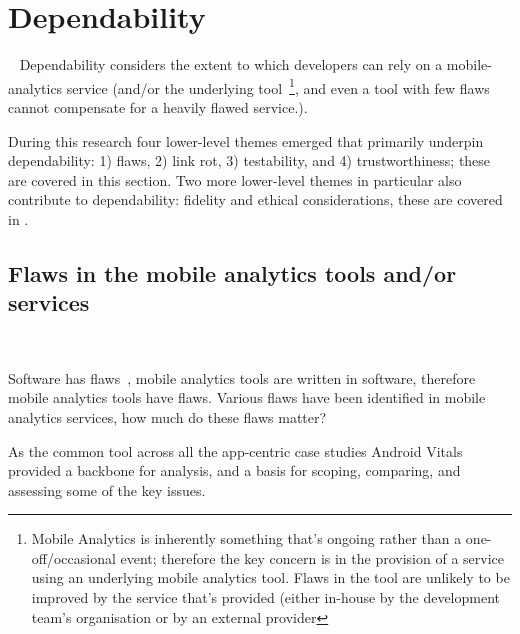 \section{Dependability}~\label{section-dependability}
Dependability considers the extent to which developers can rely on a mobile-analytics service (and/or the underlying tool~\footnote{Mobile Analytics is inherently something that's ongoing rather than a one-off/occasional event; therefore the key concern is in the provision of a service using an underlying mobile analytics tool. Flaws in the tool are unlikely to be improved by the service that's provided (either in-house by the development team's organisation or by an external provider}, and even a tool with few flaws cannot compensate for a heavily flawed service.). 

During this research four lower-level themes emerged that primarily underpin dependability: 1) flaws, 2) link rot, 3) testability, and 4) trustworthiness; these are covered in this section. Two more lower-level themes in particular also contribute to dependability: fidelity and ethical considerations, these are covered in .

\subsection{Flaws in the mobile analytics tools and/or services}~\label{tata-flaws-topic}

Software has flaws~, mobile analytics tools are written in software, therefore mobile analytics tools have flaws. %
Various flaws have been identified in mobile analytics services, how much do these flaws matter? 

As the common tool across all the app-centric case studies Android Vitals provided a backbone for analysis, and a basis for scoping, comparing, and assessing some of the key issues.

